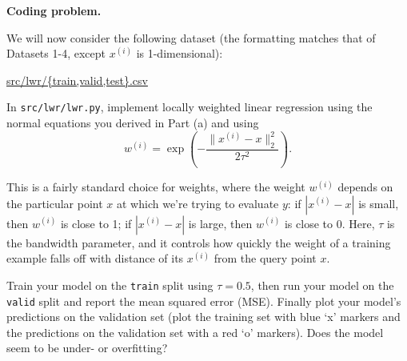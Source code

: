 \item {} \textbf{Coding problem.}

We will now consider the following dataset (the
formatting matches that of Datasets 1-4, except $x^{(i)}$ is 1-dimensional):
\begin{center}
	\url{src/lwr/{train,valid,test}.csv}	
\end{center}

In \texttt{src/lwr/lwr.py}, implement locally weighted linear regression
using the normal equations you derived in Part (a) and using
%
\begin{equation*}
	w^{(i)} = \exp\left(-\frac{\|x^{(i)} - x\|_2^2}{2\tau^2}\right).
\end{equation*}
%

This is a fairly standard choice for weights, where the weight $w^{(i)}$ depends on the particular point $x$ at which we're trying to evaluate $y$:  if $|x^{(i)} - x|$ is small, then $w^{(i)}$ is close to 1; if $|x^{(i)} - x|$ is large, then $w^{(i)}$ is close to 0. Here, $\tau$ is the bandwidth parameter, and it controls how quickly the weight of a training example falls off with distance of its $x^{(i)}$ from the query point $x$.

Train your model on the \texttt{train} split using $\tau = 0.5$, then run your
model on the \texttt{valid} split and report the mean squared error (MSE).
Finally plot your model's predictions on the validation set (plot the
training set with blue `x' markers and the predictions on the
validation set with a red `o' markers). Does the model seem to be under-
or overfitting?
